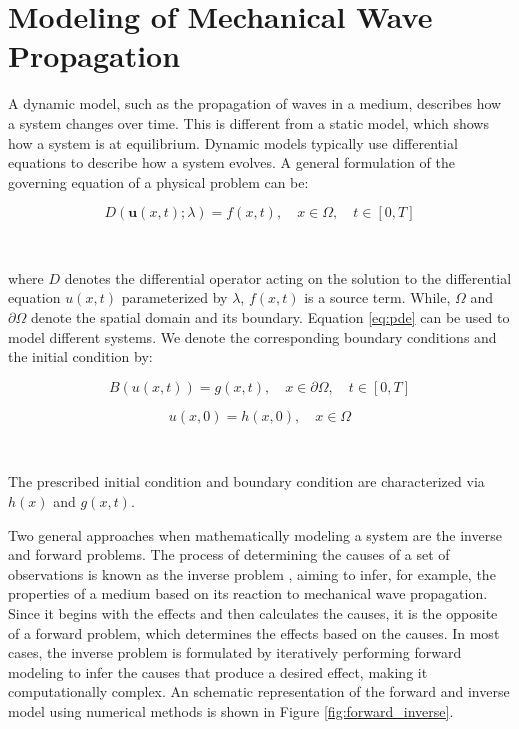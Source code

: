 \documentclass[11pt,twoside]{article}
\begin{document}
\section{Modeling of Mechanical Wave Propagation}\label{sec:fordward_inverse_modeling_mechanical_waves}

A dynamic model, such as the propagation of waves in a medium, describes how a system changes over time. This is different from a 
static model, which shows how a system is at equilibrium. Dynamic models typically use differential equations to describe how a 
system evolves. A general formulation of the governing equation of a physical problem can be:

\begin{equation}
D(\boldsymbol{u}(x,t); \lambda) = f(x,t), \quad x \in \Omega, \quad t \in [0, T]\label{eq:pde}
\end{equation}

\

where $D$ denotes the differential operator acting on the solution to the differential equation $u(x,t)$ parameterized 
by $\lambda$, $f(x, t)$ is a source term. While, $\Omega$ and $\partial\Omega$ denote the spatial domain and its boundary. 
Equation \ref{eq:pde} can be used to model different systems. We denote the corresponding boundary conditions and the initial 
condition by:

\begin{equation}
B (u(x, t)) = g(x, t), \quad x \in \partial \Omega, \quad t \in [0, T] 
\end{equation}

\begin{equation}
u(x, 0) = h(x, 0), \quad x \in \Omega
\end{equation}

\

The prescribed initial condition and boundary condition are characterized via $h(x)$ and $g(x, t)$.

Two general approaches when mathematically modeling a system are the inverse and forward problems. The process of determining the causes 
of a set of observations is known as the inverse problem \citep{Tarantola}, aiming to infer, for example, the properties of a medium 
based on its reaction to mechanical wave propagation. Since it begins with the effects and then calculates the causes, it is the 
opposite of a forward problem, which determines the effects based on the causes. In most cases, the inverse problem is formulated 
by iteratively performing forward modeling to infer the causes that produce a desired effect, making it computationally complex. 
An schematic representation of the forward and inverse model using numerical methods is shown in Figure \ref{fig:forward_inverse}.
\end{document}
